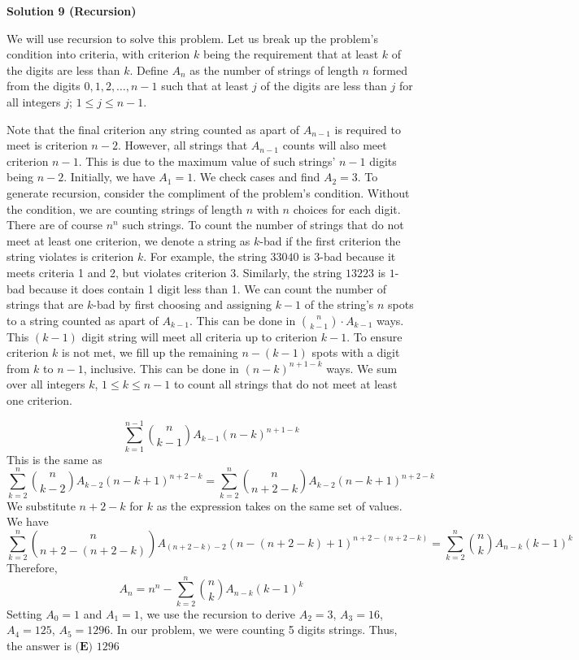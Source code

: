 \begin{enumerate}
\textbf{Solution 9 (Recursion)}

We will use recursion to solve this problem. Let us break up the problem's condition into criteria, with criterion \( k \) being the requirement that at least \( k \) of the digits are less than \( k \). Define \( A_n \) as the number of strings of length \( n \) formed from the digits \( 0, 1, 2, \dots, n-1 \) such that at least \( j \) of the digits are less than \( j \) for all integers \( j \); \( 1 \le j \le n-1 \).

 Note that the final criterion any string counted as apart of \( A_{n-1} \) is required to meet is criterion \( n-2 \). However, all strings that \( A_{n-1} \) counts will also meet criterion \( n-1 \). This is due to the maximum value of such strings' \( n-1 \) digits being \( n-2 \). Initially, we have \( A_1 = 1 \). We check cases and find \( A_2 = 3 \). To generate recursion, consider the compliment of the problem's condition. Without the condition, we are counting strings of length \( n \) with \( n \) choices for each digit. There are of course \( n^n \) such strings. To count the number of strings that do not meet at least one criterion, we denote a string as \( k \)-bad if the first criterion the string violates is criterion \( k \). For example, the string $33040$ is $3$-bad because it meets criteria 1 and 2, but violates criterion 3. Similarly, the string $13223$ is $1$-bad because it does contain 1 digit less than 1. We can count the number of strings that are \( k \)-bad by first choosing and assigning \( k-1 \) of the string's \( n \) spots to a string counted as apart of \( A_{k-1} \). This can be done in \( \binom{n}{k-1} \cdot A_{k-1} \) ways. This \( (k-1) \) digit string will meet all criteria up to criterion \( k-1 \). To ensure criterion \( k \) is not met, we fill up the remaining \( n-(k-1) \) spots with a digit from \( k \) to \( n-1 \), inclusive. This can be done in \( (n-k)^{n+1-k} \) ways. We sum over all integers \( k \), \( 1 \le k \le n-1 \) to count all strings that do not meet at least one criterion.

 
 \[\sum_{k=1}^{n-1} \binom{n}{k-1} A_{k-1} (n-k)^{n+1-k}\]This is the same as
 \[\sum_{k=2}^{n} \binom{n}{k-2} A_{k-2} (n-k+1)^{n+2-k}=\sum_{k=2}^{n} \binom{n}{n+2-k} A_{k-2} (n-k+1)^{n+2-k}\]We substitute \( n+2-k \) for \( k \) as the expression takes on the same set of values. We have
 \[\sum_{k=2}^{n} \binom{n}{n+2-(n+2-k)} A_{(n+2-k)-2} (n-(n+2-k)+1)^{n+2-(n+2-k)} = \sum_{k=2}^{n} \binom{n}{k} A_{n-k} (k-1)^k\]Therefore,
 \[A_n = n^n - \sum_{k=2}^{n} \binom{n}{k} A_{n-k} (k-1)^k\]Setting \( A_0 = 1 \) and \( A_1 = 1 \), we use the recursion to derive \( A_2 = 3 \), \( A_3 = 16 \), \( A_4 = 125 \), \( A_5 = 1296 \). In our problem, we were counting 5 digits strings. Thus, the answer is $\boxed{\textbf{(E) }1296}$





\end{enumerate}
